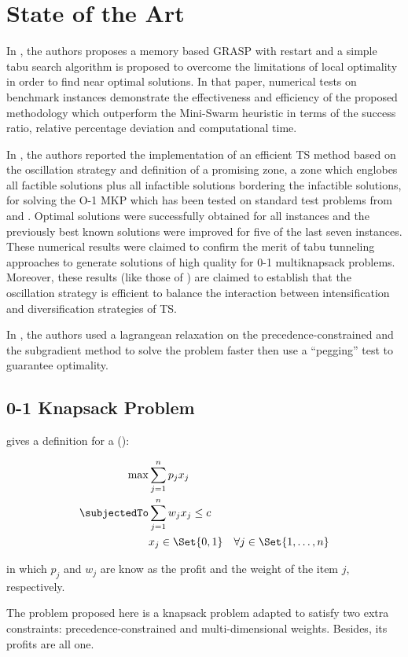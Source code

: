 \section{State of the Art}

In \cite{bib:grasp-and-tabu}, the authors proposes a memory based GRASP with restart and a simple tabu search algorithm is proposed to overcome the limitations of local optimality in order to find near optimal solutions. In that paper, numerical tests on benchmark instances demonstrate the effectiveness and efficiency of the proposed methodology which outperform the Mini-Swarm heuristic in terms of the success ratio, relative percentage deviation and computational time.

In \cite{bib:tabu-knapsack}, the authors reported the implementation of an efficient TS method based on the oscillation strategy and definition of a promising zone, a zone which englobes all factible solutions plus all infactible solutions bordering the infactible solutions, for solving the O-1 MKP which has been tested on standard test problems from \cite{bib:freville,bib:preprocessing-knapsack-1994} and \cite{bib:tabu-multidimensional-knapsack}. Optimal solutions were successfully obtained for all instances and the previously best known solutions were improved for five of the last seven instances. These numerical results were claimed to confirm the merit of tabu tunneling approaches to generate solutions of high quality for 0-1 multiknapsack problems. Moreover, these results (like those of \cite{bib:tabu-multidimensional-knapsack}) are claimed to establish that the oscillation strategy is efficient to balance the interaction between intensification and diversification strategies of TS.

In \cite{bib:constrained-knapsack}, the authors used a lagrangean relaxation on the precedence-constrained and the subgradient method to solve the problem faster then use a ``pegging'' test to guarantee optimality.


\subsection{0-1 Knapsack Problem}

\cite{bib:knapsack-problems} gives a definition for a \zoKPV (\zoKP):

\begin{eqnarray}
    \label{problem:knapsack-problem}
    \max & \displaystyle\sum\limits_{j=1}^{n} p_j x_j \\
    \subjectedTo
        & \displaystyle\sum\limits_{j=1}^{n} w_j x_j \leq c \nonumber\\
        & x_j \in \Set{0, 1} \quad \forall j \in \Set{1, \dots, n} \nonumber
\end{eqnarray}

in which $p_j$ and $w_j$ are know as the profit and the weight of the item $j$, respectively.

The problem proposed here is a knapsack problem adapted to satisfy two extra constraints: precedence-constrained and multi-dimensional weights. Besides, its profits are all one.
